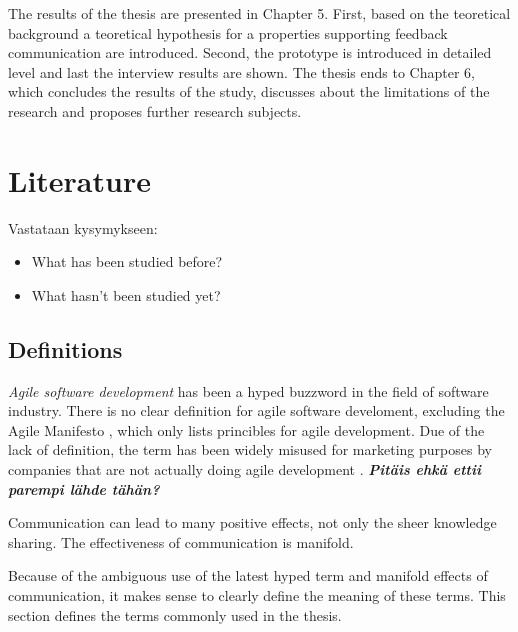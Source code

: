 \documentclass[english,12pt,a4paper,pdftex]{article}
\begin{document}
The results of the thesis are presented in Chapter 5. First, based on the teoretical background a teoretical hypothesis for a properties supporting feedback communication are introduced. Second, the prototype is introduced in detailed level and last the interview results are shown. The thesis ends to Chapter 6, which concludes the results of the study, discusses about the limitations of the research and proposes further research subjects.

\thispagestyle{empty}


\clearpage

\section{Literature}

Vastataan kysymykseen:

\begin{itemize}
\item What has been studied before?
\item What hasn't been studied yet?
\end{itemize}



\subsection{Definitions}

\emph{Agile software development} has been a hyped buzzword in the field of software industry. There is no clear definition for agile software develoment, excluding the Agile Manifesto \citep{agilemanifesto}, which only lists princibles for agile development. Due of the lack of definition, the term has been widely misused for marketing purposes by companies that are not actually doing agile development \citep{signleton2012}. \textbf{\emph{Pitäis ehkä ettii parempi lähde tähän?}}

Communication can lead to many positive effects, not only the sheer knowledge sharing. The effectiveness of communication is manifold.

Because of the ambiguous use of the latest hyped term and manifold effects of communication, it makes sense to clearly define the meaning of these terms. This section defines the terms commonly used in the thesis.
\end{document}
